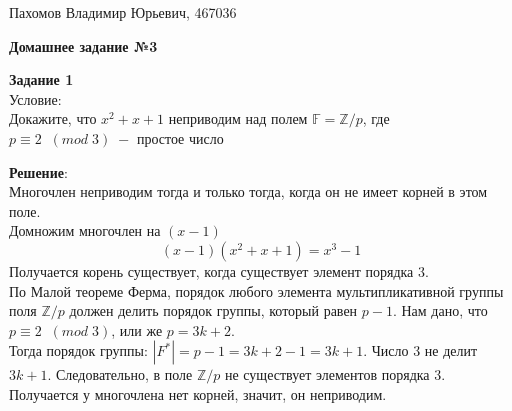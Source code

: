 \documentclass[12pt]{article}
\begin{document}
\begin{flushright}
    Пахомов Владимир Юрьевич, 467036
\end{flushright}

\begin{center}
    \textbf{Домашнее задание №3}
\end{center}

\begin{flushleft}
    \textbf{Задание 1} \\
    Условие: \\
     Докажите, что $x^2 + x + 1$ неприводим над полем $\mathbb{F} = \mathbb{Z}/p$, где $p \equiv 2 \; \; (mod \; 3) \; -$ простое число
     
    
    \vspace{20pt}
    \textbf{Решение}: \\
    Многочлен неприводим тогда и только тогда, когда он не имеет корней в этом поле. \\
    Домножим многочлен на $(x-1)$ \\
    \[ (x - 1)(x^2 + x + 1) = x^3 - 1\]
    Получается корень существует, когда существует элемент порядка 3. \\
    По Малой теореме Ферма, порядок любого элемента мультипликативной группы поля $\mathbb{Z}/p$ должен делить порядок группы, который равен $p-1$. Нам дано, что $p \equiv 2 \; \; (mod \; 3)$, или же $p = 3k+2$. \\
    Тогда порядок группы: $|F^*| = p-1=3k+2-1=3k+1$.
    Число 3 не делит $3k+1$. Следовательно, в поле $\mathbb{Z}/p$ не существует элементов порядка 3. Получается у многочлена нет корней, значит, он неприводим.
\end{flushleft}


\newpage
\end{document}

